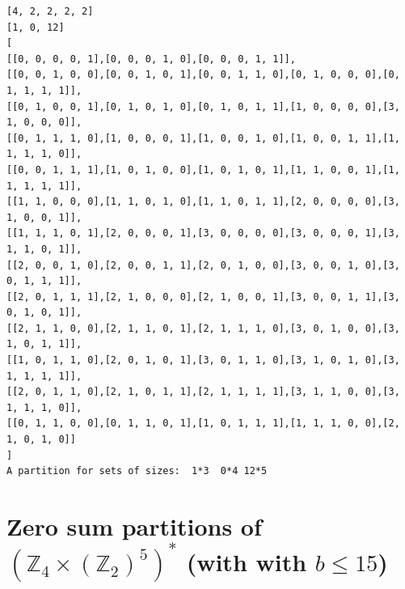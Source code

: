 \documentclass[final]{dmtcs-episciences}
\newcommand{\zet}{\mathbb{Z}}
\begin{document}
\begin{appendices}
\begin{verbatim}
[4, 2, 2, 2, 2]
[1, 0, 12]
[
[[0, 0, 0, 0, 1],[0, 0, 0, 1, 0],[0, 0, 0, 1, 1]],
[[0, 0, 1, 0, 0],[0, 0, 1, 0, 1],[0, 0, 1, 1, 0],[0, 1, 0, 0, 0],[0, 1, 1, 1, 1]],
[[0, 1, 0, 0, 1],[0, 1, 0, 1, 0],[0, 1, 0, 1, 1],[1, 0, 0, 0, 0],[3, 1, 0, 0, 0]],
[[0, 1, 1, 1, 0],[1, 0, 0, 0, 1],[1, 0, 0, 1, 0],[1, 0, 0, 1, 1],[1, 1, 1, 1, 0]],
[[0, 0, 1, 1, 1],[1, 0, 1, 0, 0],[1, 0, 1, 0, 1],[1, 1, 0, 0, 1],[1, 1, 1, 1, 1]],
[[1, 1, 0, 0, 0],[1, 1, 0, 1, 0],[1, 1, 0, 1, 1],[2, 0, 0, 0, 0],[3, 1, 0, 0, 1]],
[[1, 1, 1, 0, 1],[2, 0, 0, 0, 1],[3, 0, 0, 0, 0],[3, 0, 0, 0, 1],[3, 1, 1, 0, 1]],
[[2, 0, 0, 1, 0],[2, 0, 0, 1, 1],[2, 0, 1, 0, 0],[3, 0, 0, 1, 0],[3, 0, 1, 1, 1]],
[[2, 0, 1, 1, 1],[2, 1, 0, 0, 0],[2, 1, 0, 0, 1],[3, 0, 0, 1, 1],[3, 0, 1, 0, 1]],
[[2, 1, 1, 0, 0],[2, 1, 1, 0, 1],[2, 1, 1, 1, 0],[3, 0, 1, 0, 0],[3, 1, 0, 1, 1]],
[[1, 0, 1, 1, 0],[2, 0, 1, 0, 1],[3, 0, 1, 1, 0],[3, 1, 0, 1, 0],[3, 1, 1, 1, 1]],
[[2, 0, 1, 1, 0],[2, 1, 0, 1, 1],[2, 1, 1, 1, 1],[3, 1, 1, 0, 0],[3, 1, 1, 1, 0]],
[[0, 1, 1, 0, 0],[0, 1, 1, 0, 1],[1, 0, 1, 1, 1],[1, 1, 1, 0, 0],[2, 1, 0, 1, 0]]
]
A partition for sets of sizes:  1*3  0*4 12*5
\end{verbatim}

\newpage
\section{\texorpdfstring{Zero sum partitions of $\left(\zet_4\times(\zet_2)^{5}\right)^*$ (with with $b\leq 15$)}{Zero sum partitions of (Z4 x (Z2)**5)* (with with b <= 15)}}\label{a:422222}


\end{appendices}
\end{document}
